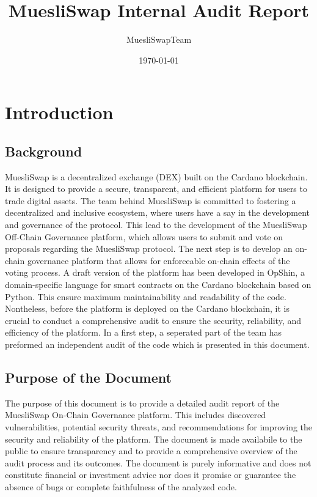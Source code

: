 \documentclass[11pt]{article}
\title{MuesliSwap Internal Audit Report}
\author{MuesliSwapTeam}
\date{\today}
\begin{document}
\maketitle

\section{Introduction}
\subsection{Background}
MuesliSwap is a decentralized exchange (DEX) built on the Cardano blockchain.
It is designed to provide a secure, transparent, and efficient platform for users to trade digital assets.
The team behind MuesliSwap is committed to fostering a decentralized and inclusive ecosystem, where users have a say in the development and governance of the protocol.
This lead to the development of the MuesliSwap Off-Chain Governance platform, which allows users to submit and vote on proposals regarding the MuesliSwap protocol.
The next step is to develop an on-chain governance platform that allows for enforceable on-chain effects of the voting process.
A draft version of the platform has been developed in OpShin, a domain-specific language for smart contracts on the Cardano blockchain based on Python.
This ensure maximum maintainability and readability of the code.
Nontheless, before the platform is deployed on the Cardano blockchain, it is crucial to conduct a comprehensive audit to ensure the security, reliability, and efficiency of the platform.
In a first step, a seperated part of the team has preformed an independent audit of the code which is presented in this document.

\subsection{Purpose of the Document}
The purpose of this document is to provide a detailed audit report of the MuesliSwap On-Chain Governance platform.
This includes discovered vulnerabilities, potential security threats, and recommendations for improving the security and reliability of the platform.
The document is made availabile to the public to ensure transparency and to provide a comprehensive overview of the audit process and its outcomes.
The document is purely informative and does not constitute financial or investment advice nor does it promise or guarantee the absence of bugs
or complete faithfulness of the analyzed code.
\end{document}

